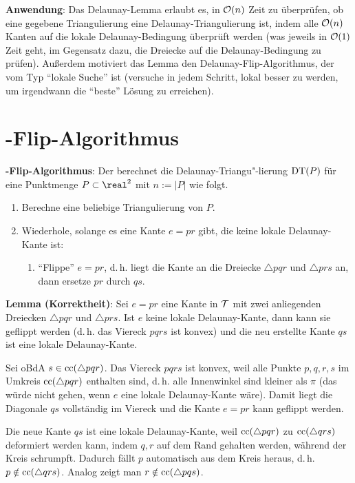 \linie

\textbf{Anwendung}:
Das Delaunay-Lemma erlaubt es, in $\mathcal{O}(n)$ Zeit zu überprüfen, ob eine gegebene Triangulierung
eine Delaunay-Triangulierung ist, indem alle
$\mathcal{O}(n)$ Kanten auf die lokale Delaunay-Bedingung überprüft werden
(was jeweils in $\mathcal{O}(1)$ Zeit geht,
im Gegensatz dazu, die Dreiecke auf die Delaunay-Bedingung zu prüfen).
Außerdem motiviert das Lemma den Delaunay-Flip-Algorithmus, der vom Typ "`lokale Suche"' ist
(versuche in jedem Schritt, lokal besser zu werden, um irgendwann die "`beste"' Lösung zu
erreichen).

\pagebreak

\section{%
    -Flip-Algorithmus%
}

\textbf{-Flip-Algorithmus}:
Der  berechnet die Delaunay-Triangu"-lierung $\operatorname{DT}(P)$
für eine Punktmenge $P \subset \real^2$ mit $n := |P|$ wie folgt.
\begin{enumerate}
    \item
    Berechne eine beliebige Triangulierung von $P$.

    \item
    Wiederhole, solange es eine Kante $e = pr$ gibt, die keine lokale Delaunay-Kante ist:
    \begin{enumerate}
        \item
        "`Flippe"' $e = pr$,
        d.\,h. liegt die Kante an die Dreiecke $\triangle pqr$ und $\triangle prs$ an,
        dann ersetze $pr$ durch $qs$.
    \end{enumerate}
\end{enumerate}

\linie

\textbf{Lemma (Korrektheit)}:
Sei $e = pr$ eine Kante in $\mathcal{T}$ mit zwei anliegenden Dreiecken $\triangle pqr$ und $\triangle prs$.
Ist $e$ keine lokale Delaunay-Kante, dann kann sie geflippt werden
(d.\,h. das Viereck $pqrs$ ist konvex)
und die neu erstellte Kante $qs$ ist eine lokale Delaunay-Kante.

\begin{Beweis}
    Sei oBdA $s \in \operatorname{cc}(\triangle pqr)$.
    Das Viereck $pqrs$ ist konvex, weil alle Punkte $p, q, r, s$ im Umkreis $\operatorname{cc}(\triangle pqr)$
    enthalten sind, d.\,h. alle Innenwinkel sind kleiner als $\pi$
    (das würde nicht gehen, wenn $e$ eine lokale Delaunay-Kante wäre).
    Damit liegt die Diagonale $qs$ vollständig im Viereck und die Kante $e = pr$ kann geflippt
    werden.

    Die neue Kante $qs$ ist eine lokale Delaunay-Kante, weil $\operatorname{cc}(\triangle pqr)$ zu
    $\operatorname{cc}(\triangle qrs)$ deformiert werden kann, indem $q, r$ auf dem Rand gehalten werden,
    während der Kreis schrumpft.
    Dadurch fällt $p$ automatisch aus dem Kreis heraus, d.\,h. $p \notin \operatorname{cc}(\triangle qrs)$.
    Analog zeigt man $r \notin \operatorname{cc}(\triangle pqs)$.
\end{Beweis}

